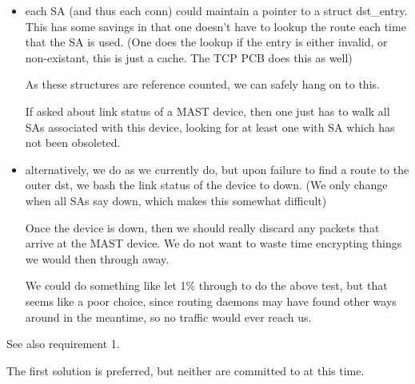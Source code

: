 \begin{itemize}
\item each SA (and thus each conn) could maintain a pointer to
   a struct dst\_entry. This has some savings in that one doesn't
   have to lookup the route each time that the SA is used.
   (One does the lookup if the entry is either invalid, or non-existant,
   this is just a cache. The TCP PCB does this as well)

   As these structures are reference counted, we can safely hang
   on to this.

   If asked about link status of a MAST device, then one just has to walk
   all SAs associated with this device, looking for at least one with SA
   which has not been obsoleted.

\item alternatively, we do as we currently do, but upon failure to find
   a route to the outer dst, we bash the link status of the device to
   down. (We only change when all SAs say down, which makes this somewhat
   difficult)

   Once the device is down, then we should really discard any packets that
   arrive at the MAST device. We do not want to waste time encrypting things
   we would then through away. 

   We could do something like let 1\% through to do the above test, but that
   seems like a poor choice, since routing daemons may have found other ways
   around in the meantime, so no traffic would ever reach us.

\end{itemize}

See also requirement 1.

The first solution is preferred, but neither are committed to at this time.



     






